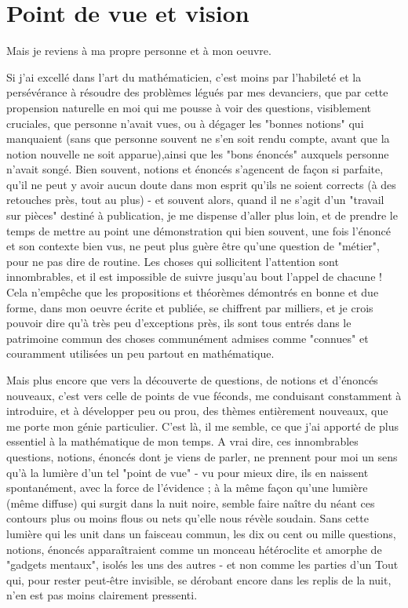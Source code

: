 \section{Point de vue et vision}

Mais je reviens à ma propre personne et à mon oeuvre.

Si j'ai excellé dans l'art du mathématicien, c'est moins par l'habileté et la persévérance à résoudre des problèmes légués par mes devanciers, que par cette propension naturelle en moi qui me pousse à voir des questions, visiblement cruciales, que personne n'avait vues, ou à dégager les "bonnes notions" qui manquaient (sans que personne souvent ne s'en soit rendu compte, avant que la notion nouvelle ne soit apparue),ainsi que les "bons énoncés" auxquels personne n'avait songé. Bien souvent, notions et énoncés s'agencent de façon si parfaite, qu'il ne peut y avoir aucun doute dans mon esprit qu'ils ne soient corrects (à des retouches près, tout au plus) - et souvent alors, quand il ne s'agit d'un "travail sur pièces" destiné à publication, je me dispense d'aller plus loin, et de prendre le temps de mettre au point une démonstration qui bien souvent, une fois l'énoncé et son contexte bien vus, ne peut plus guère être qu'une question de "métier", pour ne pas dire de routine. Les choses qui sollicitent l'attention sont innombrables, et il est impossible de suivre jusqu'au bout l'appel de chacune ! Cela n'empêche que les propositions et théorèmes démontrés en bonne et due forme, dans mon oeuvre écrite et publiée, se chiffrent par milliers, et je crois pouvoir dire qu'à très peu d'exceptions près, ils sont tous entrés dans le patrimoine commun des choses communément admises comme "connues" et couramment utilisées un peu partout en mathématique.

Mais plus encore que vers la découverte de questions, de notions et d'énoncés nouveaux, c'est vers celle de points de vue féconds, me conduisant constamment à introduire, et à développer peu ou prou, des thèmes entièrement nouveaux, que me porte mon génie particulier. C'est là, il me semble, ce que j'ai apporté de plus essentiel à la mathématique de mon temps. A vrai dire, ces innombrables questions, notions, énoncés dont je viens de parler, ne prennent pour moi un sens qu'à la lumière d'un tel "point de vue" - vu pour mieux dire, ils en naissent spontanément, avec la force de l'évidence ; à la même façon qu'une lumière (même diffuse) qui surgit dans la nuit noire, semble faire naître du néant ces contours plus ou moins flous ou nets qu'elle nous révèle soudain. Sans cette lumière qui les unit dans un faisceau commun, les dix ou cent ou mille questions, notions, énoncés apparaîtraient comme un monceau hétéroclite et amorphe de "gadgets mentaux", isolés les uns des autres - et non comme les parties d'un Tout qui, pour rester peut-être invisible, se dérobant encore dans les replis de la nuit, n'en est pas moins clairement pressenti.

